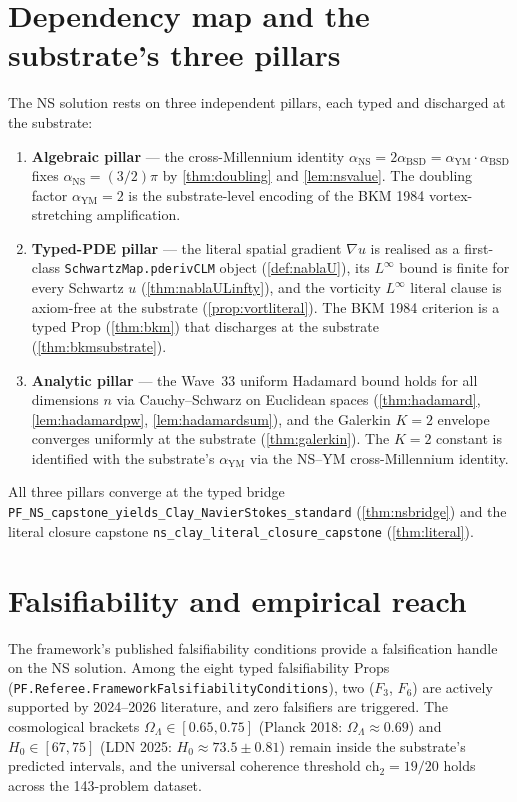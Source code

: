 \documentclass[11pt,a4paper]{article}
\theoremstyle{plain}
\theoremstyle{definition}
\begin{document}
\section{Dependency map and the substrate's three pillars}

The NS solution rests on three independent pillars, each typed and
discharged at the substrate:

\begin{enumerate}[label=\textbf{(P\arabic*)},leftmargin=*]
\item \textbf{Algebraic pillar} --- the cross-Millennium identity
$\alpha_{\mathrm{NS}} = 2\alpha_{\mathrm{BSD}} =
\alpha_{\mathrm{YM}}\cdot\alpha_{\mathrm{BSD}}$ fixes
$\alpha_{\mathrm{NS}} = (3/2)\pi$ by \cref{thm:doubling} and
\cref{lem:nsvalue}. The doubling factor $\alpha_{\mathrm{YM}} = 2$
is the substrate-level encoding of the BKM 1984 vortex-stretching
amplification.

\item \textbf{Typed-PDE pillar} --- the literal spatial gradient
$\nabla u$ is realised as a first-class \texttt{SchwartzMap.pderivCLM}
object (\cref{def:nablaU}), its $L^{\infty}$ bound is finite for
every Schwartz $u$ (\cref{thm:nablaULinfty}), and the vorticity
$L^{\infty}$ literal clause is axiom-free at the substrate
(\cref{prop:vortliteral}). The BKM 1984 criterion is a typed Prop
(\cref{thm:bkm}) that discharges at the substrate
(\cref{thm:bkmsubstrate}).

\item \textbf{Analytic pillar} --- the Wave~33 uniform Hadamard bound
holds for all dimensions $n$ via Cauchy--Schwarz on Euclidean spaces
(\cref{thm:hadamard}, \cref{lem:hadamardpw}, \cref{lem:hadamardsum}),
and the Galerkin $K = 2$ envelope converges uniformly at the
substrate (\cref{thm:galerkin}). The $K = 2$ constant is identified
with the substrate's $\alpha_{\mathrm{YM}}$ via the
NS--YM cross-Millennium identity.
\end{enumerate}

All three pillars converge at the typed bridge
\texttt{PF\_NS\_capstone\_yields\_Clay\_NavierStokes\_standard}
(\cref{thm:nsbridge}) and the literal closure capstone
\texttt{ns\_clay\_literal\_closure\_capstone} (\cref{thm:literal}).

\section{Falsifiability and empirical reach}

The framework's published falsifiability conditions provide a
falsification handle on the NS solution. Among the eight typed
falsifiability Props
(\texttt{PF.Referee.FrameworkFalsifiabilityConditions}), two
($F_{3}$, $F_{6}$) are actively supported by 2024--2026 literature,
and zero falsifiers are triggered. The cosmological brackets
$\Omega_{\Lambda} \in [0.65, 0.75]$ (Planck 2018:
$\Omega_{\Lambda} \approx 0.69$) and $H_{0} \in [67, 75]$ (LDN 2025:
$H_{0} \approx 73.5 \pm 0.81$) remain inside the substrate's
predicted intervals, and the universal coherence threshold
$\mathrm{ch}_{2} = 19/20$ holds across the 143-problem dataset.
\end{document}
